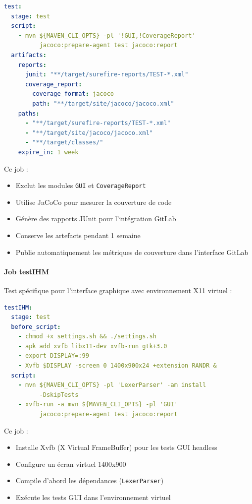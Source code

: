 \vspace{0.3cm}
\begin{lstlisting}[language=yaml, caption=Job de test]
test:
  stage: test
  script:
    - mvn ${MAVEN_CLI_OPTS} -pl '!GUI,!CoverageReport'
          jacoco:prepare-agent test jacoco:report
  artifacts:
    reports:
      junit: "**/target/surefire-reports/TEST-*.xml"
      coverage_report:
        coverage_format: jacoco
        path: "**/target/site/jacoco/jacoco.xml"
    paths:
      - "**/target/surefire-reports/TEST-*.xml"
      - "**/target/site/jacoco/jacoco.xml"
      - "**/target/classes/"
    expire_in: 1 week
\end{lstlisting}

Ce job :
\begin{itemize}
    \item Exclut les modules \texttt{GUI} et \texttt{CoverageReport}
    \item Utilise JaCoCo pour mesurer la couverture de code
    \item Génère des rapports JUnit pour l'intégration GitLab
    \item Conserve les artefacts pendant 1 semaine
    \item Publie automatiquement les métriques de couverture dans l'interface GitLab
\end{itemize}

\paragraph{Job testIHM}

Test spécifique pour l'interface graphique avec environnement X11 virtuel :

\begin{lstlisting}[language=yaml, caption=Job de test IHM avec Xvfb]
testIHM:
  stage: test
  before_script:
    - chmod +x settings.sh && ./settings.sh
    - apk add xvfb libx11-dev xvfb-run gtk+3.0
    - export DISPLAY=:99
    - Xvfb $DISPLAY -screen 0 1400x900x24 +extension RANDR &
  script:
    - mvn ${MAVEN_CLI_OPTS} -pl 'LexerParser' -am install
          -DskipTests
    - xvfb-run -a mvn ${MAVEN_CLI_OPTS} -pl 'GUI'
          jacoco:prepare-agent test jacoco:report
\end{lstlisting}

Ce job :
\begin{itemize}
    \item Installe Xvfb (X Virtual FrameBuffer) pour les tests GUI headless
    \item Configure un écran virtuel 1400x900
    \item Compile d'abord les dépendances (\texttt{LexerParser})
    \item Exécute les tests GUI dans l'environnement virtuel
\end{itemize}

